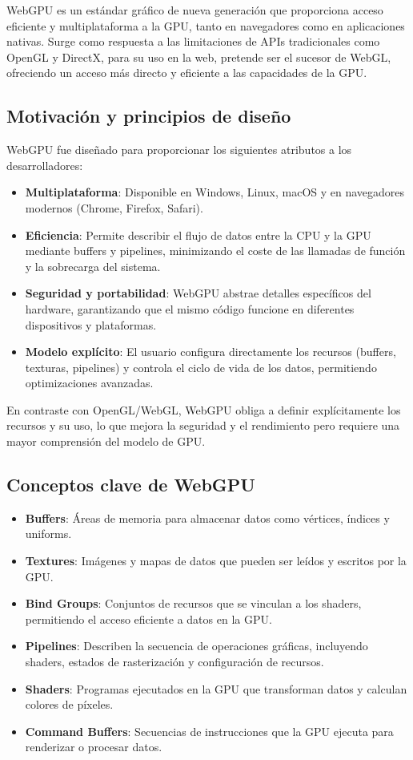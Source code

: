 WebGPU es un estándar gráfico de nueva generación que proporciona acceso
eficiente y multiplataforma a la GPU, tanto en navegadores como en aplicaciones
nativas. Surge como respuesta a las limitaciones de APIs tradicionales
como OpenGL y DirectX, para su uso en la web, pretende ser el sucesor de WebGL,
ofreciendo un acceso más directo y eficiente a las capacidades de la GPU.

\subsection{Motivación y principios de diseño}

WebGPU fue diseñado para proporcionar los siguientes atributos a los desarrolladores:

\begin{itemize}
    \item \textbf{Multiplataforma}: Disponible en Windows, Linux, macOS y en navegadores modernos (Chrome, Firefox, Safari).
    \item \textbf{Eficiencia}: Permite describir el flujo de datos entre la CPU y la GPU mediante buffers y pipelines, minimizando el coste de las llamadas de función y la sobrecarga del sistema.
    \item \textbf{Seguridad y portabilidad}: WebGPU abstrae detalles específicos del hardware, garantizando que el mismo código funcione en diferentes dispositivos y plataformas.
    \item \textbf{Modelo explícito}: El usuario configura directamente los recursos (buffers, texturas, pipelines) y controla el ciclo de vida de los datos, permitiendo optimizaciones avanzadas.
\end{itemize}

En contraste con OpenGL/WebGL, WebGPU obliga a definir explícitamente los
recursos y su uso, lo que mejora la seguridad y el rendimiento pero requiere
una mayor comprensión del modelo de GPU.

\subsection{Conceptos clave de WebGPU}

\begin{itemize}
    \item \textbf{Buffers}: Áreas de memoria para almacenar datos como vértices, índices y uniforms.
    \item \textbf{Textures}: Imágenes y mapas de datos que pueden ser leídos y escritos por la GPU.
    \item \textbf{Bind Groups}: Conjuntos de recursos que se vinculan a los shaders, permitiendo el acceso eficiente a datos en la GPU.
    \item \textbf{Pipelines}: Describen la secuencia de operaciones gráficas, incluyendo shaders, estados de rasterización y configuración de recursos.
    \item \textbf{Shaders}: Programas ejecutados en la GPU que transforman datos y calculan colores de píxeles.
    \item \textbf{Command Buffers}: Secuencias de instrucciones que la GPU ejecuta para renderizar o procesar datos.
\end{itemize}

